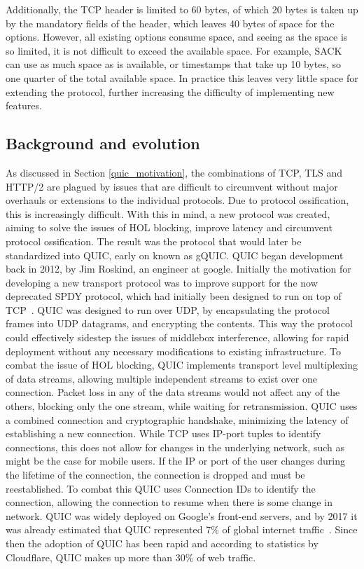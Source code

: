 \documentclass[english, 12pt, a4paper, elec, utf8, a-2b, online]{aaltothesis}
\begin{document}
Additionally, the TCP header is limited to 60 bytes, of which 20 bytes is taken
up by the mandatory fields of the header, which leaves 40 bytes of space for the options.
However, all existing options consume space, and seeing as the space is so limited,
it is not difficult to exceed the available space. For example, SACK can use as much
space as is available, or timestamps that take up 10  bytes, so one quarter of
the total available space. In practice this leaves very little space for extending
the protocol, further increasing the difficulty of implementing new features\cite{ietf-tcpm-tcp-edo-15}.

\subsection{Background and evolution}
As discussed in Section \ref{quic_motivation}, the combinations of TCP, TLS and HTTP/2 are
plagued by issues that are difficult to circumvent without major overhauls or extensions to
the individual protocols. Due to protocol ossification, this is increasingly difficult. With
this in mind, a new protocol was created, aiming to solve the issues of
HOL blocking, improve latency and circumvent protocol ossification. The result
was the protocol that would later be standardized into QUIC, early on known as gQUIC.
QUIC began development back in 2012, by Jim Roskind, an engineer at google. Initially
the motivation for developing a new transport protocol was to improve support for
the now deprecated SPDY protocol, which had initially been designed to run on top
of TCP~\cite{googleQUICDesign}. QUIC was designed to run over
UDP, by encapsulating the protocol frames into UDP datagrams, and encrypting the contents.
This way the protocol could effectively sidestep the issues of middlebox interference, allowing
for rapid deployment without any necessary modifications to existing infrastructure.
To combat the issue of HOL blocking, QUIC implements transport level multiplexing of
data streams, allowing multiple independent streams to exist over one connection.
Packet loss in any of the data streams would not affect any of the others, blocking
only the one stream, while waiting for retransmission. QUIC uses a combined connection and
cryptographic handshake, minimizing the latency of establishing a new connection.
While TCP uses IP-port tuples to identify connections, this does not allow for changes in the
underlying network, such as might be the case for mobile users. If the IP or port
of the user changes during the lifetime of the connection,
the connection is dropped and must be reestablished. To combat this QUIC uses
Connection IDs to identify the connection, allowing the connection to resume when
there is some change in network. QUIC was widely deployed on Google's front-end servers,
and by 2017 it was already estimated that QUIC represented 7\% of global internet
traffic~\cite{quic_transport_protocol_design}. Since then the adoption of QUIC has
been rapid and according to statistics by Cloudflare, QUIC makes up more than 30\% of web traffic\cite{cloudflare_radar}.
\end{document}
